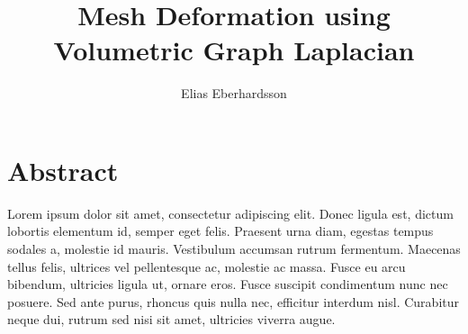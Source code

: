 \documentclass[8pt]{article}
\title{\textbf{Mesh Deformation using Volumetric Graph Laplacian}}
\author{Elias Eberhardsson}
\date{}
\begin{document}
\maketitle


\section{Abstract}

 Lorem ipsum dolor sit amet, consectetur adipiscing elit. Donec ligula est, dictum lobortis elementum id, semper eget felis. Praesent urna diam, egestas tempus sodales a, molestie id mauris. Vestibulum accumsan rutrum fermentum. Maecenas tellus felis, ultrices vel pellentesque ac, molestie ac massa. Fusce eu arcu bibendum, ultricies ligula ut, ornare eros. Fusce suscipit condimentum nunc nec posuere. Sed ante purus, rhoncus quis nulla nec, efficitur interdum nisl. Curabitur neque dui, rutrum sed nisi sit amet, ultricies viverra augue.
\end{document}
